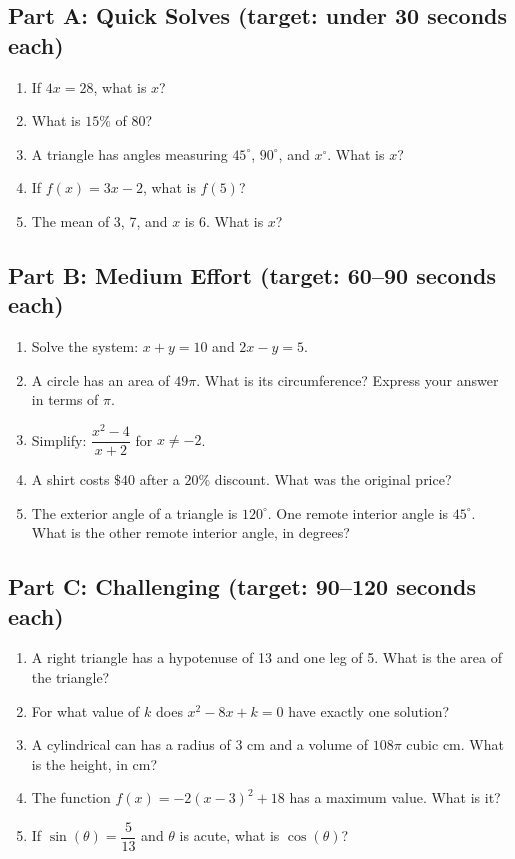 \documentclass[14pt]{extarticle}
\begin{document}
\subsection*{Part A: Quick Solves (target: under 30 seconds each)}
\begin{enumerate}
  \item If \(4x = 28\), what is \(x\)?
  \item What is \(15\%\) of 80?
  \item A triangle has angles measuring \(45^\circ\), \(90^\circ\), and \(x^\circ\). What is \(x\)?
  \item If \(f(x) = 3x - 2\), what is \(f(5)\)?
  \item The mean of 3, 7, and \(x\) is 6. What is \(x\)?
\end{enumerate}

\subsection*{Part B: Medium Effort (target: 60--90 seconds each)}
\begin{enumerate}
  \item Solve the system: \(x + y = 10\) and \(2x - y = 5\).
  \item A circle has an area of \(49\pi\). What is its circumference? Express your answer in terms of \(\pi\).
  \item Simplify: \(\dfrac{x^2 - 4}{x + 2}\) for \(x \neq -2\).
  \item A shirt costs \(\$40\) after a \(20\%\) discount. What was the original price?
  \item The exterior angle of a triangle is \(120^\circ\). One remote interior angle is \(45^\circ\). What is the other remote interior angle, in degrees?
\end{enumerate}

\subsection*{Part C: Challenging (target: 90--120 seconds each)}
\begin{enumerate}
  \item A right triangle has a hypotenuse of 13 and one leg of 5. What is the area of the triangle?
  \item For what value of \(k\) does \(x^2 - 8x + k = 0\) have exactly one solution?
  \item A cylindrical can has a radius of 3 cm and a volume of \(108\pi\) cubic cm. What is the height, in cm?
  \item The function \(f(x) = -2(x - 3)^2 + 18\) has a maximum value. What is it?
  \item If \(\sin(\theta) = \dfrac{5}{13}\) and \(\theta\) is acute, what is \(\cos(\theta)\)?
\end{enumerate}
\end{document}
